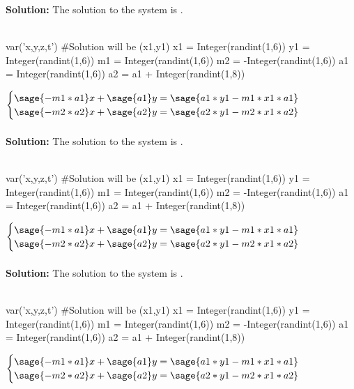 \documentclass{ximera}
\begin{document}
\begin{shuffle}
\begin{question}
{\bf Solution:} The solution to the system is 
.\\\\
\end{question}
\begin{question}
\begin{sagesilent}
var('x,y,z,t')
#Solution will be (x1,y1)
x1 = Integer(randint(1,6))
y1 = Integer(randint(1,6))
m1 = Integer(randint(1,6))
m2 = -Integer(randint(1,6)) 
a1 = Integer(randint(1,6))
a2 = a1 + Integer(randint(1,8))
\end{sagesilent}
$\begin{cases}
\sage{-m1*a1}x+\sage{a1}y=\sage{a1*y1-m1*x1*a1}\\
\sage{-m2*a2}x+\sage{a2}y=\sage{a2*y1-m2*x1*a2}\\
\end{cases}$\\\\

{\bf Solution:} The solution to the system is 
.\\\\
\end{question}
\begin{question}
\begin{sagesilent}
var('x,y,z,t')
#Solution will be (x1,y1)
x1 = Integer(randint(1,6))
y1 = Integer(randint(1,6))
m1 = Integer(randint(1,6))
m2 = -Integer(randint(1,6)) 
a1 = Integer(randint(1,6))
a2 = a1 + Integer(randint(1,8))
\end{sagesilent}
$\begin{cases}
\sage{-m1*a1}x+\sage{a1}y=\sage{a1*y1-m1*x1*a1}\\
\sage{-m2*a2}x+\sage{a2}y=\sage{a2*y1-m2*x1*a2}\\
\end{cases}$\\\\

{\bf Solution:} The solution to the system is 
.\\\\
\end{question}
\begin{question}
\begin{sagesilent}
var('x,y,z,t')
#Solution will be (x1,y1)
x1 = Integer(randint(1,6))
y1 = Integer(randint(1,6))
m1 = Integer(randint(1,6))
m2 = -Integer(randint(1,6)) 
a1 = Integer(randint(1,6))
a2 = a1 + Integer(randint(1,8))
\end{sagesilent}
$\begin{cases}
\sage{-m1*a1}x+\sage{a1}y=\sage{a1*y1-m1*x1*a1}\\
\sage{-m2*a2}x+\sage{a2}y=\sage{a2*y1-m2*x1*a2}\\
\end{cases}$\\\\


\end{question}
\end{shuffle}
\end{document}
